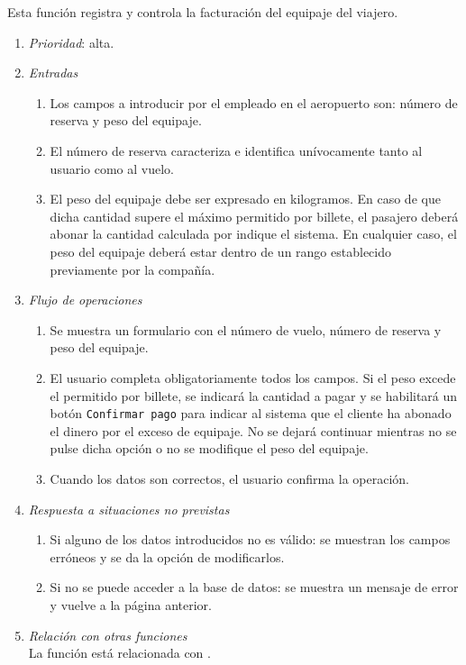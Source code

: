 

 \label{fun:facturar}
	Esta función registra y controla la facturación del equipaje del viajero.

	\begin{enumerate}
		\item \textit{Prioridad}: alta.
		\item \textit{Entradas}
			\begin{enumerate}
				\item Los campos a introducir por el empleado en el aeropuerto son: número de reserva y peso del equipaje.
				\item El número de reserva caracteriza e identifica unívocamente tanto al usuario como al vuelo.
				\item El peso del equipaje debe ser expresado en kilogramos. En caso de que dicha cantidad supere el máximo permitido por billete, el pasajero deberá abonar la cantidad calculada por indique el sistema. En cualquier caso, el peso del equipaje deberá estar dentro de un rango establecido previamente por la compañía.
			\end{enumerate}
		\item \textit{Flujo de operaciones}
			\begin{enumerate}
				\item Se muestra un formulario con el número de vuelo, número de reserva y peso del equipaje.
				\item El usuario completa obligatoriamente todos los campos. Si el peso excede el permitido por billete, se indicará la cantidad a pagar y se habilitará un botón \verb|Confirmar pago| para indicar al sistema que el cliente ha abonado el dinero por el exceso de equipaje. No se dejará continuar mientras no se pulse dicha opción o no se modifique el peso del equipaje.
				\item Cuando los datos son correctos, el usuario confirma la operación.
			\end{enumerate}
		\item \textit{Respuesta a situaciones no previstas}
			\begin{enumerate}
				\item Si alguno de los datos introducidos no es válido: se muestran los campos erróneos y se da la opción de modificarlos.
				\item Si no se puede acceder a la base de datos: se muestra un mensaje de error y vuelve a la página anterior.
			\end{enumerate}
		\item \textit{Relación con otras funciones}\\
		La función está relacionada con .		
	\end{enumerate}	
